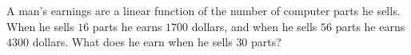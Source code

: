 A man's earnings are a linear function of the number of computer parts he sells. When he sells $16$ parts he earns $1700$ dollars, and when he sells $56$ parts he earns $4300$ dollars. What does he earn when he sells $30$ parts?
